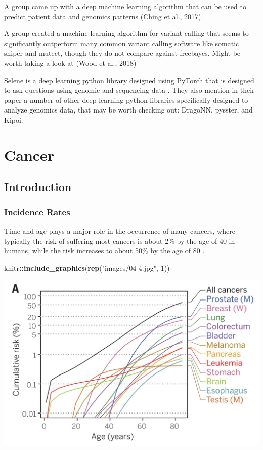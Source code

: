 \documentclass[]{book}
\newenvironment{Shaded}{\begin{snugshade}}{\end{snugshade}}
\newcommand{\DecValTok}[1]{\textcolor[rgb]{0.00,0.00,0.81}{#1}}
\newcommand{\KeywordTok}[1]{\textcolor[rgb]{0.13,0.29,0.53}{\textbf{#1}}}
\newcommand{\NormalTok}[1]{#1}
\newcommand{\OperatorTok}[1]{\textcolor[rgb]{0.81,0.36,0.00}{\textbf{#1}}}
\newcommand{\StringTok}[1]{\textcolor[rgb]{0.31,0.60,0.02}{#1}}
\begin{document}
A group came up with a deep machine learning algorithm that can be used to predict patient data and genomics patterns (Ching et al., 2017).

A group created a machine-learning algorithm for variant calling that seems to significantly outperform many common variant calling software like somatic sniper and mutect, though they do not compare against freebayes. Might be worth taking a look at (Wood et al., 2018)

Selene is a deep learning python library designed using PyTorch that is designed to ask questions using genomic and sequencing data \citep{chen2019selene}. They also mention in their paper a number of other deep learning python libraries specifically designed to analyze genomics data, that may be worth checking out: DragoNN, pysster\citep{budach2018pysster}, and Kipoi\citep{avsec2018kipoi}.

\hypertarget{cancer}{%
\chapter{Cancer}\label{cancer}}

\hypertarget{introduction-4}{%
\section{Introduction}\label{introduction-4}}

\hypertarget{incidence-rates}{%
\subsection{Incidence Rates}\label{incidence-rates}}

Time and age plays a major role in the occurrence of many cancers, where typically the risk of suffering most cancers is about 2\% by the age of 40 in humans, while the risk increases to about 50\% by the age of 80 \citep{martincorena2015somatic}.

\begin{Shaded}
\begin{Highlighting}[]
\NormalTok{knitr}\OperatorTok{::}\KeywordTok{include_graphics}\NormalTok{(}\KeywordTok{rep}\NormalTok{(}\StringTok{"images/04-4.jpg"}\NormalTok{, }\DecValTok{1}\NormalTok{))}
\end{Highlighting}
\end{Shaded}

\includegraphics{images/04-4.jpg}
\end{document}
